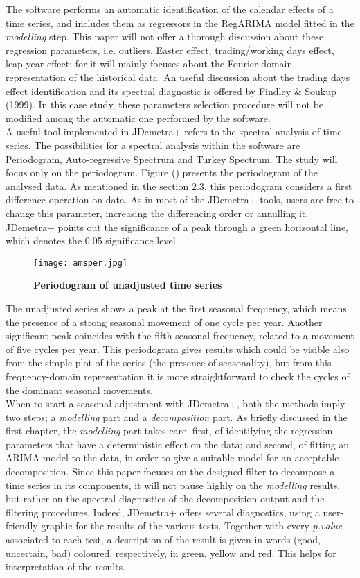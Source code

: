 \documentclass{article}
\begin{document}
The software performs an automatic identification of the calendar effects of a time series, and includes them as regressors in the RegARIMA model fitted in the \textit{modelling} step. This paper will not offer a thorough discussion about these regression parameters, i.e. outliers, Easter effect, trading/working days effect, leap-year effect; for it will mainly focuses about the Fourier-domain representation of the historical data. An useful discussion about the trading days effect identification and its spectral diagnostic is offered by Findley \& Soukup (1999). In this case study, these parameters selection procedure will not be modified among the automatic one performed by the software.\\A useful tool implemented in JDemetra+ refers to the spectral analysis of time series. The possibilities for a spectral analysis within the software are Periodogram, Auto-regressive Spectrum and Turkey Spectrum. The study will focus only on the periodogram. Figure () presents the periodogram of the analysed data. As mentioned in the section 2.3, this periodogram considers a first difference operation on data. As in most of the JDemetra+ tools, users are free to change this parameter, increasing the differencing order or annulling it. JDemetra+ points out the significance of a peak through a green horizontal line, which denotes the 0.05 significance level.
\begin{figure}[H]
  \texttt{[image: amsper.jpg]}
  \caption{\textbf{\footnotesize Periodogram of unadjusted time series}}
  \label{fig:1}
\end{figure}
The unadjusted series shows a peak at the first seasonal frequency, which means the presence of a strong seasonal movement of one cycle per year. Another significant peak coincides with the fifth seasonal frequency, related to a movement of five cycles per year. This periodogram gives results which could be visible also from the simple plot of the series (the presence of seasonality), but from this frequency-domain representation it is more straightforward to check the cycles of the dominant seasonal movements.\\When to start a seasonal adjustment with JDemetra+, both the methods imply two steps; a \textit{modelling} part and a \textit{decomposition} part. As briefly discussed in the first chapter, the \textit{modelling} part takes care, first, of identifying the regression parameters that have a deterministic effect on the data; and second, of fitting an ARIMA model to the data, in order to give a suitable model for an acceptable decomposition. Since this paper focuses on the designed filter to decompose a time series in its components, it will not pause highly on the \textit{modelling} results, but rather on the spectral diagnostics of the decomposition output and the filtering procedures. Indeed, JDemetra+ offers several diagnostics, using a user-friendly graphic for the results of the various tests. Together with every \textit{p.value} associated to each test, a description of the result is given in words (good, uncertain, bad) coloured, respectively, in green, yellow and red. This helps for interpretation of the results.
\end{document}
